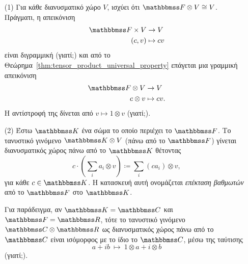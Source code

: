 \documentclass[12pt,a4paper,reqno]{amsart}
\begin{document}
\begin{example}
    \leavevmode
    \begin{itemize}
        \item[(1)] Για κάθε διανυσματικό χώρο $V$, ισχύει ότι $\FF \otimes V \cong V$. Πράγματι, η απεικόνιση 
        \begin{align*}
            \FF\times{V} &\to V \\
            (c,v) &\mapsto cv
        \end{align*}
        είναι διγραμμική (γιατί;) και από το Θεώρημα~\ref{thm:tensor_product_universal_property} επάγεται μια γραμμική απεικόνιση 
        \begin{align*}
            \FF\otimes{V} &\to V \\
            c\otimes{v} &\mapsto cv.
        \end{align*}
        Η αντίστροφή της δίνεται από $v \mapsto 1 \otimes v$ (γιατί;).
        \item[(2)] Έστω $\KK$ ένα σώμα το οποίο περιέχει το $\FF$. Το τανυστικό γινόμενο $\KK \otimes V$ (πάνω από το $\FF$) γίνεται διανυσματικός χώρος πάνω από το $\KK$ θέτοντας 
        \[
        c \cdot \left(\sum_{i} a_i \otimes v\right) \coloneqq \sum_{i} (ca_i) \otimes v,
        \]
        για κάθε $c \in \KK$. Η κατασκευή αυτή ονομάζεται \emph{επέκταση βαθμωτών} από το $\FF$ στο $\KK$. 

        Για παράδειγμα, αν $\KK = \CC$ και $\FF = \RR$, τότε το τανυστικό γινόμενο $\CC \otimes \RR$ ως διανυσματικός χώρος πάνω από το $\CC$ είναι ισόμορφος με το ίδιο το $\CC$, μέσω της ταύτισης
        \[
        a + ib \ \mapsto \ 1 \otimes a + i \otimes b 
        \]
        (γιατί;).
    \end{itemize}
\end{example}
\end{document}
